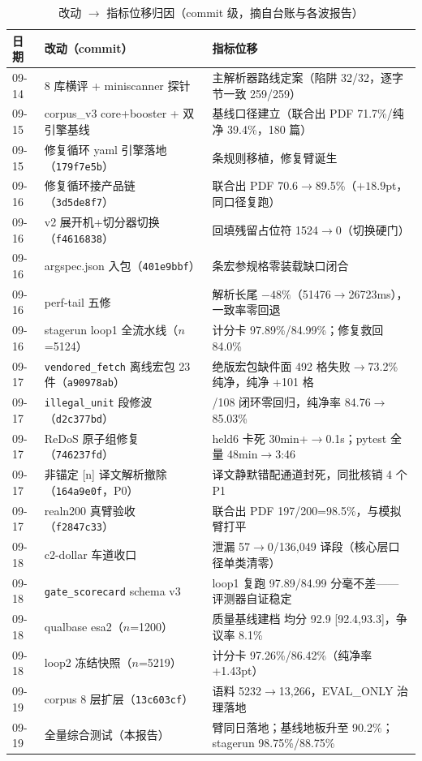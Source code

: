 \begin{table}[htbp]
\centering\small
\caption{改动 $\to$ 指标位移归因（commit 级，摘自台账与各波报告）}
\label{tab:attrib}
\begin{tabular}{@{}ll>{\raggedright\arraybackslash}p{7.5cm}@{}}
\toprule
日期 & 改动（commit） & 指标位移 \\
\midrule
09-14 & 8 库横评 + miniscanner 探针 & 主解析器路线定案（陷阱 32/32，逐字节一致 259/259） \\
09-15 & corpus\_v3 core+booster + 双引擎基线 & 基线口径建立（联合出 PDF 71.7\%/纯净 39.4\%，180 篇） \\
09-15 & 修复循环 yaml 引擎落地（\texttt{179f7e5b}） & 25 条规则移植，修复臂诞生 \\
09-16 & 修复循环接产品链（\texttt{3d5de8f7}） & 联合出 PDF 70.6$\to$89.5\%（$+18.9$pt，同口径复跑） \\
09-16 & v2 展开机+切分器切换（\texttt{f4616838}） & 回填残留占位符 1524$\to$0（切换硬门） \\
09-16 & argspec.json 入包（\texttt{401e9bbf}） & 1820 条宏参规格零装载缺口闭合 \\
09-16 & perf-tail 五修 & 解析长尾 $-48\%$（51476$\to$26723ms），一致率零回退 \\
09-16 & stagerun loop1 全流水线（$n$=5124） & 计分卡 97.89\%/84.99\%；修复救回 84.0\% \\
09-17 & \texttt{vendored\_fetch} 离线宏包 23 件（\texttt{a90978ab}） & 绝版宏包缺件面 492 格失败$\to$73.2\% 纯净，纯净 +101 格 \\
09-17 & \texttt{illegal\_unit} 段修波（\texttt{d2c377bd}） & 108/108 闭环零回归，纯净率 84.76$\to$85.03\% \\
09-17 & ReDoS 原子组修复（\texttt{746237fd}） & held6 卡死 30min+$\to$0.1s；pytest 全量 48min$\to$3:46 \\
09-17 & 非锚定 [n] 译文解析撤除（\texttt{164a9e0f}，P0） & 译文静默错配通道封死，同批核销 4 个 P1 \\
09-17 & realn200 真臂验收（\texttt{f2847c33}） & 联合出 PDF 197/200=98.5\%，与模拟臂打平 \\
09-18 & c2-dollar 车道收口 & 泄漏 57$\to$0/136{,}049 译段（核心层口径单类清零） \\
09-18 & \texttt{gate\_scorecard} schema v3 & loop1 复跑 97.89/84.99 分毫不差——评测器自证稳定 \\
09-18 & qualbase esa2（$n$=1200） & 质量基线建档 均分 92.9 [92.4,93.3]，争议率 8.1\% \\
09-18 & loop2 冻结快照（$n$=5219） & 计分卡 97.26\%/86.42\%（纯净率 +1.43pt） \\
09-19 & corpus 8 层扩层（\texttt{13c603cf}） & 语料 5232$\to$13{,}266，EVAL\_ONLY 治理落地 \\
09-19 & 全量综合测试（本报告） & 12 臂同日落地；基线地板升至 90.2\%；stagerun 98.75\%/88.75\% \\
\bottomrule
\end{tabular}
\end{table}
